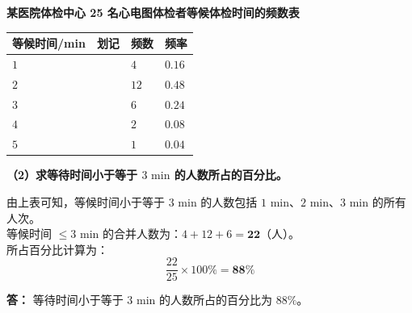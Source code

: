 \vspace{0.2cm}
\begin{center}
\textbf{某医院体检中心 25 名心电图体检者等候体检时间的频数表} \\
\vspace{0.2cm}
\renewcommand{\arraystretch}{1.5}
\begin{tabular}{|>{\centering\arraybackslash}p{3cm}|>{\centering\arraybackslash}p{3.5cm}|>{\centering\arraybackslash}p{2.5cm}|>{\centering\arraybackslash}p{2.5cm}|}
  \hline
  \cellcolor{gray!15} 等候时间/min & \cellcolor{gray!15} 划记 & \cellcolor{gray!15} 频数 & \cellcolor{gray!15} 频率 \\
  \hline
  $1$ & \textbf{\textcolor{red!70!black}{\zhengIV{}}} & \textbf{\textcolor{red!70!black}{$4$}} & \textbf{\textcolor{red!70!black}{$0.16$}} \\
  \hline
  $2$ & \textbf{\textcolor{red!70!black}{\zhengV{} \quad \zhengV{} \quad \zhengII{}}} & \textbf{\textcolor{red!70!black}{$12$}} & \textbf{\textcolor{red!70!black}{$0.48$}} \\
  \hline
  $3$ & \textbf{\textcolor{red!70!black}{\zhengV{} \quad \zhengI{}}} & \textbf{\textcolor{red!70!black}{$6$}} & \textbf{\textcolor{red!70!black}{$0.24$}} \\
  \hline
  $4$ & \textbf{\textcolor{red!70!black}{\zhengII{}}} & \textbf{\textcolor{red!70!black}{$2$}} & \textbf{\textcolor{red!70!black}{$0.08$}} \\
  \hline
  $5$ & \textbf{\textcolor{red!70!black}{\zhengI{}}} & \textbf{\textcolor{red!70!black}{$1$}} & \textbf{\textcolor{red!70!black}{$0.04$}} \\
  \hline
\end{tabular}
\end{center}

\vspace{0.6cm}

\textbf{（2）求等待时间小于等于 $3\text{ min}$ 的人数所占的百分比。}

\vspace{0.2cm}

由上表可知，等候时间小于等于 $3\text{ min}$ 的人数包括 $1\text{ min}$、$2\text{ min}$、$3\text{ min}$ 的所有人次。\\
等候时间 $\leqslant 3\text{ min}$ 的合并人数为：$4 + 12 + 6 = \boldsymbol{22}$（人）。\\
所占百分比计算为：
$$ \frac{22}{25} \times 100\% = \boldsymbol{88\%} $$

\textbf{答：} 等待时间小于等于 $3\text{ min}$ 的人数所占的百分比为 $88\%$。

